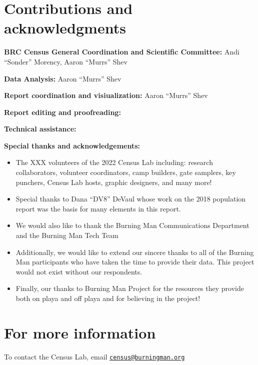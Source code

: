 \documentclass[
]{book}
\begin{document}
\hypertarget{contributions-and-acknowledgments}{%
\section*{Contributions and acknowledgments}\label{contributions-and-acknowledgments}}

\textbf{BRC Census General Coordination and Scientific Committee:} Andi ``Sonder'' Morency, Aaron ``Murrs'' Shev

\textbf{Data Analysis:} Aaron ``Murrs'' Shev

\textbf{Report coordination and visiualization:} Aaron ``Murrs'' Shev

\textbf{Report editing and proofreading:}

\textbf{Technical assistance:}

\textbf{Special thanks and acknowledgements:}

\begin{itemize}
\item
  The XXX volunteers of the 2022 Census Lab including: research collaborators,
  volunteer coordinators, camp builders, gate samplers, key punchers, Census Lab hosts,
  graphic designers, and many more!
\item
  Special thanks to Dana ``DV8'' DeVaul whose work on the 2018 population report was
  the basis for many elements in this report.
\item
  We would also like to thank the Burning Man Communications Department and the Burning Man Tech Team
\item
  Additionally, we would like to extend our sincere thanks to all of the Burning Man participants who have taken the time to provide their data. This project would not exist without our respondents.
\item
  Finally, our thanks to Burning Man Project for the resources they provide both on playa and off playa and for believing in the project!
\end{itemize}

\hypertarget{for-more-information}{%
\section*{For more information}\label{for-more-information}}

To contact the Census Lab, email \href{mailto:census@burningman.org}{\nolinkurl{census@burningman.org}}
\end{document}
